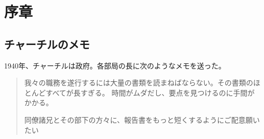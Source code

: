 \documentclass{ltjsarticle}
\begin{document}
\section{序章}
\subsection{チャーチルのメモ}
 1940年、チャーチルは政府。各部局の長に次のようなメモを送った。
 \begin{quotation}
    我々の職務を遂行するには大量の書類を読まねばならない。その書類のほとんどすべてが長すぎる。
    時間がムダだし、要点を見つけるのに手間がかかる。

    同僚諸兄とその部下の方々に、報告書をもっと短くするようにご配意願いたい
 \end{quotation}
\end{document}
